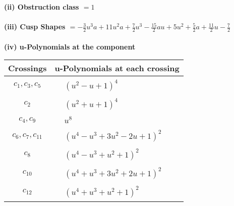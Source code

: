 \documentclass[1p]{elsarticle_modified}
\theoremstyle{definition}
\begin{document}
\flushleft \textbf{(ii) Obstruction class $= 1$}\\~\\
\flushleft \textbf{(iii) Cusp Shapes $= -\frac{3}{2} u^3 a+11 u^2 a+\frac{7}{2} u^3-\frac{15}{2} a u+5 u^2+\frac{5}{2} a+\frac{11}{2} u-\frac{7}{2}$}\\~\\
\newpage\renewcommand{\arraystretch}{1}
\flushleft \textbf{(iv) u-Polynomials at the component}\newline \\
\begin{tabular}{m{50pt}|m{274pt}}
Crossings & \hspace{64pt}u-Polynomials at each crossing \\
\hline $$\begin{aligned}c_{1},c_{3},c_{5}\end{aligned}$$&$\begin{aligned}
&(u^2- u+1)^4
\end{aligned}$\\
\hline $$\begin{aligned}c_{2}\end{aligned}$$&$\begin{aligned}
&(u^2+u+1)^4
\end{aligned}$\\
\hline $$\begin{aligned}c_{4},c_{9}\end{aligned}$$&$\begin{aligned}
&u^8
\end{aligned}$\\
\hline $$\begin{aligned}c_{6},c_{7},c_{11}\end{aligned}$$&$\begin{aligned}
&(u^4- u^3+3 u^2-2 u+1)^2
\end{aligned}$\\
\hline $$\begin{aligned}c_{8}\end{aligned}$$&$\begin{aligned}
&(u^4- u^3+u^2+1)^2
\end{aligned}$\\
\hline $$\begin{aligned}c_{10}\end{aligned}$$&$\begin{aligned}
&(u^4+u^3+3 u^2+2 u+1)^2
\end{aligned}$\\
\hline $$\begin{aligned}c_{12}\end{aligned}$$&$\begin{aligned}
&(u^4+u^3+u^2+1)^2
\end{aligned}$\\
\hline
\end{tabular}\\~\\
\end{document}
